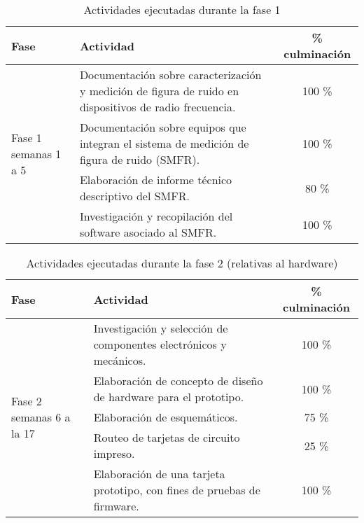 \documentclass[paper=letter,oneside,fontsize=12pt, parskip=full]{article}
\begin{document}
	
	
	
	\begin{table}[h!]
		\begin{tabularx}{\textwidth}{p{}p{}c}
			\toprule
			{\large Fase} & 
			{\large Actividad} & 
			{\large \% culminación} \\
			\midrule
			\multirow{4}{0.2\textwidth}{Fase 1 \newline semanas 1 a 5} &
			Documentación sobre caracterización y medición de figura de ruido en dispositivos de radio frecuencia. & 100 \% \\
			& Documentación sobre equipos que integran el sistema de medición de figura de ruido (SMFR). & 100 \% \\
			& Elaboración de informe técnico descriptivo del SMFR. & 80 \% \\
			& Investigación y recopilación del software asociado al SMFR. & 100 \% \\
			\bottomrule		
		\end{tabularx}
		\caption{Actividades ejecutadas durante la fase 1}
	\end{table}

	\begin{table}[h!]
		\begin{tabularx}{\textwidth}{p{}p{}c}
			\toprule
			{\large Fase} & 
			{\large Actividad} & 
			{\large \% culminación} \\
			\midrule
			\multirow{5}{0.2\textwidth}{Fase 2 \newline semanas 6 a la 17} &
			Investigación y selección de componentes electrónicos y mecánicos. & 100 \% \\
			& Elaboración de concepto de diseño de hardware para el prototipo. & 100 \% \\
			& Elaboración de esquemáticos. & 75 \% \\
			& Routeo de tarjetas de circuito impreso. & 25 \% \\	
			& Elaboración de una tarjeta prototipo, con fines de pruebas de firmware. & 100 \% \\
			\bottomrule			
		\end{tabularx}
		\caption{Actividades ejecutadas durante la fase 2 (relativas al hardware)}
	\end{table}
\end{document}
